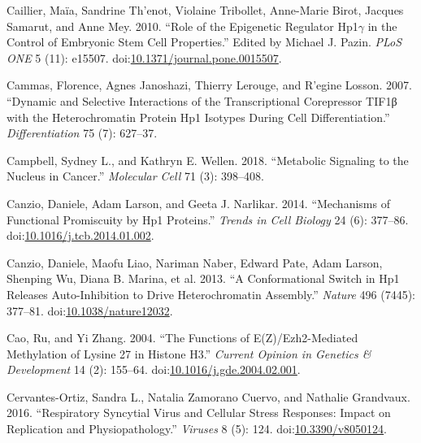 \documentclass[onehalf,12pt]{beavtex}
\begin{document}
  \hypertarget{ref-CaillierRoleEpigeneticRegulator2010}{}
  Caillier, Maïa, Sandrine Th\a'enot, Violaine Tribollet, Anne-Marie
  Birot, Jacques Samarut, and Anne Mey. 2010. ``Role of the Epigenetic
  Regulator Hp1\(\gamma\) in the Control of Embryonic Stem Cell
  Properties.'' Edited by Michael J. Pazin. \emph{PLoS ONE} 5 (11):
  e15507.
  doi:\href{https://doi.org/10.1371/journal.pone.0015507}{10.1371/journal.pone.0015507}.
  
  \hypertarget{ref-CammasDynamicselectiveinteractions2007}{}
  Cammas, Florence, Agnes Janoshazi, Thierry Lerouge, and R\a'egine
  Losson. 2007. ``Dynamic and Selective Interactions of the
  Transcriptional Corepressor TIF1β with the Heterochromatin Protein Hp1
  Isotypes During Cell Differentiation.'' \emph{Differentiation} 75 (7):
  627--37.
  
  \hypertarget{ref-CampbellMetabolicSignalingNucleus2018}{}
  Campbell, Sydney L., and Kathryn E. Wellen. 2018. ``Metabolic Signaling
  to the Nucleus in Cancer.'' \emph{Molecular Cell} 71 (3): 398--408.
  
  \hypertarget{ref-CanzioMechanismsfunctionalpromiscuity2014}{}
  Canzio, Daniele, Adam Larson, and Geeta J. Narlikar. 2014. ``Mechanisms
  of Functional Promiscuity by Hp1 Proteins.'' \emph{Trends in Cell
  Biology} 24 (6): 377--86.
  doi:\href{https://doi.org/10.1016/j.tcb.2014.01.002}{10.1016/j.tcb.2014.01.002}.
  
  \hypertarget{ref-CanzioconformationalswitchHP12013}{}
  Canzio, Daniele, Maofu Liao, Nariman Naber, Edward Pate, Adam Larson,
  Shenping Wu, Diana B. Marina, et al. 2013. ``A Conformational Switch in
  Hp1 Releases Auto-Inhibition to Drive Heterochromatin Assembly.''
  \emph{Nature} 496 (7445): 377--81.
  doi:\href{https://doi.org/10.1038/nature12032}{10.1038/nature12032}.
  
  \hypertarget{ref-CaofunctionsEZH2mediatedmethylation2004}{}
  Cao, Ru, and Yi Zhang. 2004. ``The Functions of E(Z)/Ezh2-Mediated
  Methylation of Lysine 27 in Histone H3.'' \emph{Current Opinion in
  Genetics \& Development} 14 (2): 155--64.
  doi:\href{https://doi.org/10.1016/j.gde.2004.02.001}{10.1016/j.gde.2004.02.001}.
  
  \hypertarget{ref-Cervantes-OrtizRespiratorySyncytialVirus2016}{}
  Cervantes-Ortiz, Sandra L., Natalia Zamorano Cuervo, and Nathalie
  Grandvaux. 2016. ``Respiratory Syncytial Virus and Cellular Stress
  Responses: Impact on Replication and Physiopathology.'' \emph{Viruses} 8
  (5): 124. doi:\href{https://doi.org/10.3390/v8050124}{10.3390/v8050124}.
  
\end{document}
